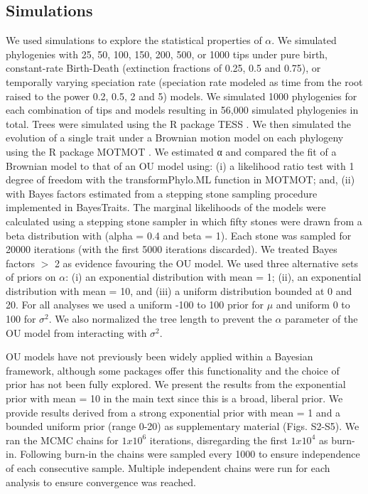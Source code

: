 \documentclass[a4paper,12pt]{article}
\begin{document}
\subsection{Simulations}
\label{section:sims.methods} 
We used simulations to explore the statistical properties of $\alpha$. We simulated phylogenies with 25, 50, 100, 150, 200, 500, or 1000 tips under pure birth, constant-rate Birth-Death (extinction fractions of 0.25, 0.5 and 0.75), or temporally varying speciation rate (speciation rate modeled as time from the root raised to the power 0.2, 0.5, 2 and 5) models. We simulated 1000 phylogenies for each combination of tips and models resulting in 56,000 simulated phylogenies in total. Trees were simulated using the R package TESS \cite{hohna2013fast}. We then simulated the evolution of a single trait under a Brownian motion model on each phylogeny using the R package MOTMOT \citep{Thomas:2011aa}.  We estimated α and compared the fit of a Brownian model to that of an OU model using: (i) a likelihood ratio test with 1 degree of freedom with the transformPhylo.ML function in MOTMOT; and, (ii) with Bayes factors estimated from a stepping stone sampling procedure \citep{xie2010improving}implemented in BayesTraits. The marginal likelihoods of the models were calculated using a stepping stone sampler in which fifty stones were drawn from a beta distribution with (alpha = 0.4 and beta = 1). Each stone was sampled for 20000 iterations (with the first 5000 iterations discarded). We treated Bayes factors $>$ 2 as evidence favouring the OU model. We used three alternative sets of priors on $\alpha$: (i) an exponential distribution with mean = 1; (ii), an exponential distribution with mean = 10, and (iii) a uniform distribution bounded at 0 and 20. For all analyses we used a uniform -100 to 100 prior for $\mu$ and uniform 0 to 100 for $\sigma^2$. We also normalized the tree length to prevent the $\alpha$ parameter of the OU model from interacting with $\sigma^2$.

OU models have not previously been widely applied within a Bayesian framework, although some packages offer this functionality \citep[e.g., diversitree;][]{FitzJohn:2012aa} and the choice of prior has not been fully explored. We present the results from the exponential prior with mean = 10 in the main text since this is a broad, liberal prior. We provide results derived from a strong exponential prior with mean = 1 and a bounded uniform prior (range 0-20) as supplementary material (Figs. S2-S5). We ran the MCMC chains for $1x10^6$ iterations, disregarding the first $1x10^4$ as burn-in. Following burn-in the chains were sampled every 1000 to ensure independence of each consecutive sample. Multiple independent chains were run for each analysis to ensure convergence was reached. 
\end{document}
